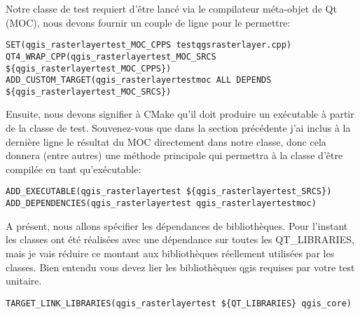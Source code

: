 Notre classe de test requiert d'\^etre lanc\'e via le compilateur m\'eta-objet de Qt (MOC), nous devons fournir un couple de ligne pour le permettre:

\begin{verbatim}
SET(qgis_rasterlayertest_MOC_CPPS testqgsrasterlayer.cpp)
QT4_WRAP_CPP(qgis_rasterlayertest_MOC_SRCS ${qgis_rasterlayertest_MOC_CPPS})
ADD_CUSTOM_TARGET(qgis_rasterlayertestmoc ALL DEPENDS ${qgis_rasterlayertest_MOC_SRCS})
\end{verbatim}

Ensuite, nous devons signifier \`a CMake qu'il doit produire un ex\'ecutable \`a partir de la classe de test. Souvenez-vous que dans la section pr\'ec\'edente j'ai inclus \`a la derni\`ere ligne le r\'esultat du MOC directement dans notre classe, donc cela donnera (entre autres) une m\'ethode principale qui permettra \`a la classe d'\^etre compil\'ee en tant qu'ex\'ecutable:

\begin{verbatim}
ADD_EXECUTABLE(qgis_rasterlayertest ${qgis_rasterlayertest_SRCS})
ADD_DEPENDENCIES(qgis_rasterlayertest qgis_rasterlayertestmoc)
\end{verbatim}

A pr\'esent, nous allons sp\'ecifier les d\'ependances de biblioth\`eques. Pour l'instant les classes ont \'et\'e r\'ealis\'ees avec une d\'ependance sur toutes les QT\_LIBRARIES, mais je vais r\'eduire ce montant aux biblioth\`eques r\'eellement utilis\'ees par les classes. Bien entendu vous devez lier les biblioth\`eques qgis requises par votre test unitaire.

\begin{verbatim}
TARGET_LINK_LIBRARIES(qgis_rasterlayertest ${QT_LIBRARIES} qgis_core)
\end{verbatim}


